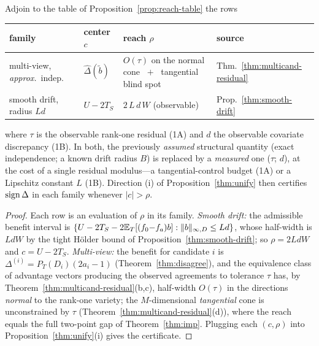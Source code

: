 \begin{proposition}\label{prop:reach-table-v05}
Adjoin to the table of Proposition~\ref{prop:reach-table} the rows
\begin{center}
\small
{%
\begin{tabular}{llll}
\hline
family & center $c$ & reach $\rho$ & source \\
\hline
multi-view, \emph{approx.}\ indep. & $\widehat\Delta(\widetilde b)$ &
  $O(\tau)$ on the normal cone $\;+\;$ tangential blind spot &
  Thm.~\ref{thm:multicand-residual} \\
smooth drift, radius $L d$ & $U-2T_S$ & $2\,L\,d\,W$ (observable) &
  Prop.~\ref{thm:smooth-drift} \\
\hline
\end{tabular}}
\end{center}
where $\tau$ is the observable rank-one residual \textup{(1A)} and $d$ the
observable covariate discrepancy \textup{(1B)}. In both, the previously
\emph{assumed} structural quantity (exact independence; a known drift radius $B$)
is replaced by a \emph{measured} one ($\tau$; $d$), at the cost of a single
residual modulus---a tangential-control budget \textup{(1A)} or a Lipschitz
constant $L$ \textup{(1B)}. Direction (i) of Proposition~\ref{thm:unify} then
certifies $\operatorname{sign}\Delta$ in each family whenever $|c|>\rho$.
\end{proposition}
\begin{proof}
Each row is an evaluation of $\rho$ in its family. \emph{Smooth drift:} the
admissible benefit interval is $\{U-2T_S-2\mathbb{E}_T[(f_0{-}f_a)b]:\|b\|_{\infty,D}\le
Ld\}$, whose half-width is $LdW$ by the tight H\"older bound of
Proposition~\ref{thm:smooth-drift}; so $\rho=2LdW$ and $c=U-2T_S$. \emph{Multi-view:}
the benefit for candidate $i$ is $\Delta^{(i)}=P_T(D_i)(2a_i-1)$
(Theorem~\ref{thm:disagree}), and the equivalence class of advantage vectors
producing the observed agreements to tolerance $\tau$ has, by
Theorem~\ref{thm:multicand-residual}(b,c), half-width $O(\tau)$ in the directions
\emph{normal} to the rank-one variety; the $M$-dimensional \emph{tangential} cone
is unconstrained by $\tau$ (Theorem~\ref{thm:multicand-residual}(d)), where the
reach equals the full two-point gap of Theorem~\ref{thm:imp}. Plugging each
$(c,\rho)$ into Proposition~\ref{thm:unify}(i) gives the certificate. \qedhere
\end{proof}

